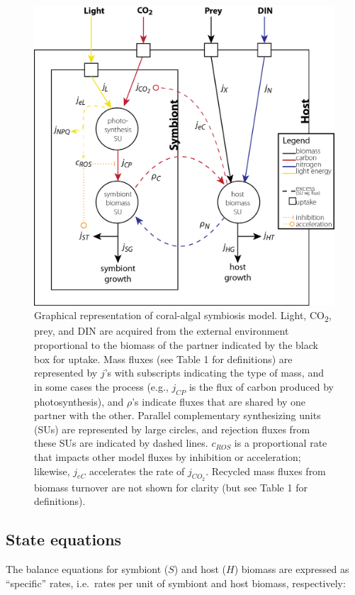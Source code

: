 \documentclass[]{elsarticle} %
\makeatletter
\def\maxwidth{\ifdim\Gin@nat@width>\linewidth\linewidth
\else\Gin@nat@width\fi}
\let\Oldincludegraphics\includegraphics
\renewcommand{\includegraphics}[1]{\Oldincludegraphics[width=\maxwidth]{#1}}
\makeatother
\begin{document}
\begin{figure}[htbp]
\centering
\includegraphics{../img/Fig1.png}
\caption{Graphical representation of coral-algal symbiosis model. Light,
CO\textsubscript{2}, prey, and DIN are acquired from the external
environment proportional to the biomass of the partner indicated by the
black box for uptake. Mass fluxes (see Table 1 for definitions) are
represented by \(j\)'s with subscripts indicating the type of mass, and
in some cases the process (e.g., \(j_{CP}\) is the flux of carbon
produced by photosynthesis), and \(\rho\)'s indicate fluxes that are
shared by one partner with the other. Parallel complementary
synthesizing units (SUs) are represented by large circles, and rejection
fluxes from these SUs are indicated by dashed lines. \(c_{ROS}\) is a
proportional rate that impacts other model fluxes by inhibition or
acceleration; likewise, \(j_{eC}\) accelerates the rate of \(j_{CO_2}\).
Recycled mass fluxes from biomass turnover are not shown for clarity
(but see Table 1 for definitions).}
\end{figure}

\subsection{State equations}\label{state-equations}

The balance equations for symbiont (\(S\)) and host (\(H\)) biomass are
expressed as ``specific'' rates, i.e.~rates per unit of symbiont and
host biomass, respectively:
\end{document}
